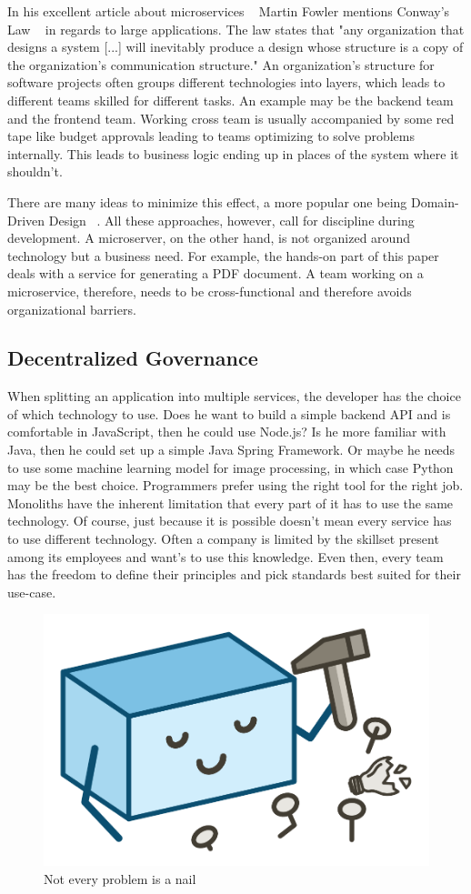 In his excellent article about microservices ~\cite{microservices.2014} Martin Fowler mentions Conway's Law ~\cite{conway.1968} in regards to large applications. The law states that "any organization that designs a system [...] will inevitably produce a design whose structure is a copy of the organization's communication structure." An organization's structure for software projects often groups different technologies into layers, which leads to different teams skilled for different tasks. An example may be the backend team and the frontend team. Working cross team is usually accompanied by some red tape like budget approvals leading to teams optimizing to solve problems internally. This leads to business logic ending up in places of the system where it shouldn't.

There are many ideas to minimize this effect, a more popular one being Domain-Driven Design ~\cite{evans.2003}. All these approaches, however, call for discipline during development. A microserver, on the other hand, is not organized around technology but a business need. For example, the hands-on part of this paper deals with a service for generating a PDF document. A team working on a microservice, therefore, needs to be cross-functional and therefore avoids organizational barriers.


\subsection{Decentralized Governance}

When splitting an application into multiple services, the developer has the choice of which technology to use. Does he want to build a simple backend API and is comfortable in JavaScript, then he could use Node.js? Is he more familiar with Java, then he could set up a simple Java Spring Framework. Or maybe he needs to use some machine learning model for image processing, in which case Python may be the best choice. Programmers prefer using the right tool for the right job. Monoliths have the inherent limitation that every part of it has to use the same technology. Of course, just because it is possible doesn't mean every service has to use different technology. Often a company is limited by the skillset present among its employees and want's to use this knowledge. Even then, every team has the freedom to define their principles and pick standards best suited for their use-case.

\begin{figure}[ht]
  \centering
  \includegraphics[width=0.4\linewidth]{assets/illustration-monolith-hammer.png}
  \caption{Not every problem is a nail}
\end{figure}

